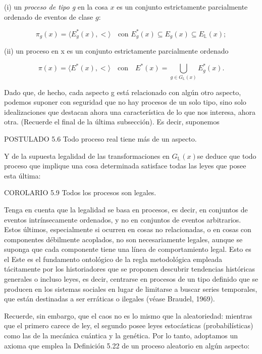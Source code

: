 \begin{justifying}
    (i) un \textit{proceso de tipo g} en la cosa $x$ es un conjunto 
    estrictamente parcialmente ordenado de eventos de clase $g$:

    \[
        \pi_g(x) = \langle E_g^*(x), < \rangle \quad \text{con } E_g^*(x) 
        \subseteq E_g(x) \subseteq E_\mathbb{L}(x);
    \]

    (ii) un proceso en x es un conjunto estrictamente parcialmente ordenado

    \[
        \pi(x) = \langle E^*(x), < \rangle \quad \text{con} \quad E^*(x) = 
        \bigcup_{g \in G_\mathbb{L}(x)} E_g^*(x).
    \]

    Dado que, de hecho, cada aspecto g está relacionado con algún otro aspecto,
    podemos suponer con seguridad que no hay procesos de un solo tipo, sino
    solo idealizaciones que destacan ahora una característica de lo que nos interesa,
    ahora otra. (Recuerde el final de la última subsección). Es decir, suponemos

    \bigskip

    \noindent POSTULADO 5.6 Todo proceso real tiene más de un aspecto.

    Y de la supuesta legalidad de las transformaciones en $G_{\mathbb{L}}(x)$se deduce
    que todo proceso que implique una cosa determinada satisface todas las leyes
    que posee esta última:

    \bigskip

    \noindent COROLARIO 5.9 Todos los procesos son legales.

    Tenga en cuenta que la legalidad se basa en procesos, es decir, en conjuntos de eventos intrínsecamente ordenados,
    y no en conjuntos de eventos arbitrarios. Estos últimos, especialmente si ocurren en cosas no relacionadas, o en cosas 
    con componentes débilmente acoplados,
    no son necesariamente legales, aunque se suponga que cada componente tiene una línea de comportamiento legal.
    Esto es el Este es el fundamento ontológico de la regla metodológica empleada tácitamente por
    los historiadores que se proponen descubrir tendencias históricas generales o incluso leyes,
    es decir, centrarse en procesos de un tipo definido que se producen en los sistemas sociales
    en lugar de limitarse a buscar series temporales, que están destinadas a ser
    erráticas o ilegales (véase Braudel, 1969).

    Recuerde, sin embargo, que el caos no es lo mismo que la aleatoriedad: mientras que el primero carece de ley, 
    el segundo posee leyes estocásticas (probabilísticas) como las de la mecánica cuántica y la genética. Por lo tanto, 
    adoptamos un axioma que emplea la Definición 5.22 de un proceso aleatorio en algún aspecto:
    

\end{justifying}
